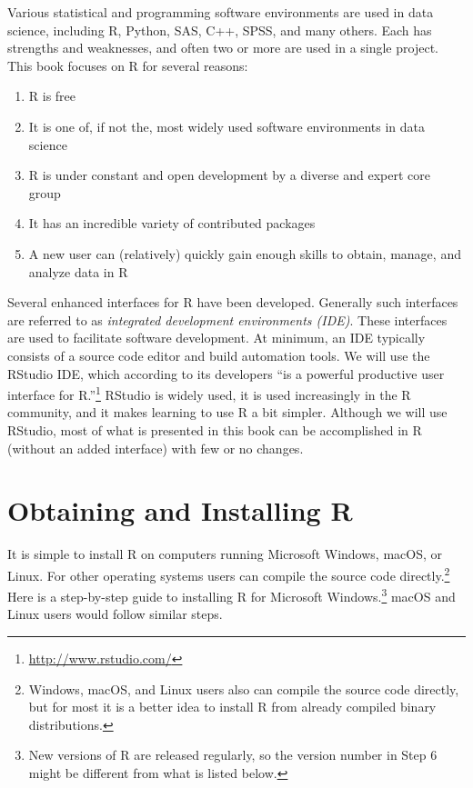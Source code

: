 \documentclass[]{krantz}
\providecommand{\tightlist}{%
  \setlength{\itemsep}{0pt}\setlength{\parskip}{0pt}}
\begin{document}
Various statistical and programming software environments are used in data science, including R, Python, SAS, C++, SPSS, and many others. Each has strengths and weaknesses, and often two or more are used in a single project. This book focuses on R for several reasons:

\begin{enumerate}
\def\labelenumi{\arabic{enumi}.}
\tightlist
\item
  R is free
\item
  It is one of, if not the, most widely used software environments in data science
\item
  R is under constant and open development by a diverse and expert core group
\item
  It has an incredible variety of contributed packages
\item
  A new user can (relatively) quickly gain enough skills to obtain, manage, and analyze data in R
\end{enumerate}

Several enhanced interfaces for R have been developed. Generally such interfaces are referred to as \emph{integrated development environments (IDE)}. These interfaces are used to facilitate software development. At minimum, an IDE typically consists of a source code editor and build automation tools. We will use the RStudio IDE, which according to its developers ``is a powerful productive user interface for R.''\footnote{\url{http://www.rstudio.com/}} RStudio is widely used, it is used increasingly in the R community, and it makes learning to use R a bit simpler. Although we will use RStudio, most of what is presented in this book can be accomplished in R (without an added interface) with few or no changes.

\hypertarget{obtaining-and-installing-r}{%
\section{Obtaining and Installing R}\label{obtaining-and-installing-r}}

It is simple to install R on computers running Microsoft Windows, macOS, or Linux. For other operating systems users can compile the source code directly.\footnote{Windows, macOS, and Linux users also can compile the source code directly, but for most it is a better idea to install R from already compiled binary distributions.}
Here is a step-by-step guide to installing R for Microsoft Windows.\footnote{New versions of R are released regularly, so the version number in Step 6 might be different from what is listed below.} macOS and Linux users would follow similar steps.
\end{document}
